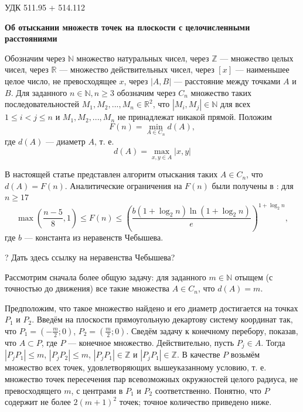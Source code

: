 \documentclass{article}
\begin{document}
УДК 511.95 + 514.112

\begin{center}
	\textbf{
	Об отыскании множеств точек на плоскости с целочисленными расстояниями}
\end{center}



Обозначим через $\mathbb{N}$ множество натуральных чисел, через $\mathbb{Z}$ --- множество целых чисел, через $\mathbb{R}$ --- множество действительных чисел, через $[x]$ --- наименьшее целое число, не превосходящее $x$, через $|A,B|$ --- расстояние между точками $A$ и $B$.
Для заданного $n\in \mathbb{N}, n\geq 3$ обозначим через $C_n$ множество таких последовательностей $M_1,M_2,...,M_n \in \mathbb{R}^2$, что $|M_i,M_j|\in\mathbb{N}$ для всех $1\leq i < j  \leq n$ и  $M_1,M_2,...,M_n$ не принадлежат никакой прямой.
Положим
$$
F(n)=\min\limits_{A\in C_n} d(A),
$$
где $d(A)$ --- диаметр $A$, т. е.
$$
d(A)=\max\limits_{x,y\in A}|x,y|
$$

В настоящей статье представлен алгоритм отыскания таких $A \in C_n$, что $d(A) = F(n)$.
Аналитические ограничения на $F(n)$ были получены в \cite{nashaStatya}:
для $n \geq 17$
	$$
		\max\left( \frac{n-5}{8}, 1 \right) \leq F(n) \leq \left( \frac{b (1+\log_2 n )\ln (1 + \log_2 n)}{e}\right)^{1+\log_2 n},
	$$
где $b$ --- константа из неравенств Чебышева.

? Дать здесь ссылку на неравенства Чебышева?




Рассмотрим сначала более общую задачу: для заданного $m \in \mathbb{N}$ отыщем (с точностью до движения) все такие множества $A \in C_n$, что $d(A) = m$.

Предположим, что такое множество найдено и его диаметр достигается на точках $P_1$ и $P_2$.
Введём на плоскости прямоугольную декартову систему координат так, что $P_1 = \left(-\frac{m}{2}; 0 \right)$, $P_2 = \left(\frac{m}{2}; 0\right)$.
Сведём задачу к конечному перебору, показав, что $A \subset P$, где $P$ --- конечное множество.
Действительно, пусть $P_{j} \in A$.
Тогда $|P_{j} P_1| \leq m$, $|P_{j} P_2| \leq m$, $|P_{j} P_1| \in \mathbb{Z}$ и $|P_{j} P_1| \in \mathbb{Z}$.
В качестве $P$ возьмём множество всех точек, удовлетворяющих вышеуказанному условию, т. е. множество точек пересечения пар всевозможных окружностей целого радиуса, не превосходящего $m$, с центрами в $P_1$ и $P_2$ соответственно.
Понятно, что $P$ содержит не более $2(m+1)^2$ точек; точное количество приведено ниже.
\end{document}
